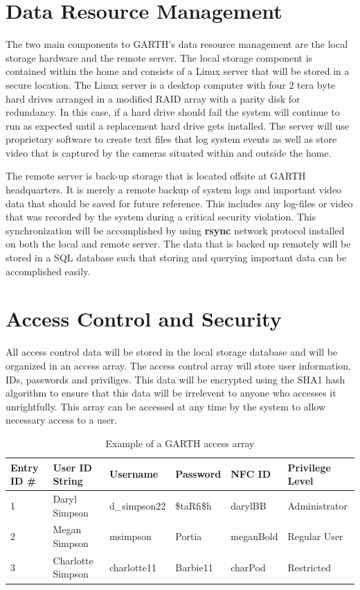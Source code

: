 \documentclass{report}
\begin{document}
\section{Data Resource Management}

The two main components to GARTH's data resource management are the local
storage hardware and the remote server. The local storage component is
contained within the home and consists of a Linux server that will be stored in
a secure location. The Linux server is a desktop computer with four 2 tera byte
hard drives arranged in a modified RAID array with a parity disk for
redundancy. In this case, if a hard drive should fail the system will continue
to run as expected until a replacement hard drive gets installed. The server
will use proprietary software  to create text files that log system events as
well as store video that is captured by the cameras situated within and outside
the home.
 
The remote server is back-up storage that is located offsite at GARTH
headquarters. It is merely a remote backup of system logs and important video
data that should be saved for future reference. This includes any log-files or
video that was recorded by the system during a critical security violation. This
synchronization will be accomplished by using \textbf{rsync} network protocol
installed on both the local and remote server. The data that is backed up
remotely will be stored in a SQL database such that storing and querying
important data can be accomplished easily.

\section{Access Control and Security}

All access control data will be stored in the local storage database and will be
organized in an access array. The access control array will store user
information, IDs, passwords and priviliges.  This data will be encrypted using
the SHA1 hash algorithm to ensure that this data will be irrelevent to anyone
who accesses it unrightfully. This array can be accessed at any time by the
system to allow necessary access to a user. 

\begin{table}[h]
    \caption{Example of a GARTH access array}
    \label{access_array}
    \centering
    \begin{tabular}{| l | l | l | l | l | l |}
    \hline
    \textbf{Entry ID \#}&\textbf{User ID String}&\textbf{Username}&
    \textbf{Password}&\textbf{NFC ID}&\textbf{Privilege Level} \\ \hline
    1&Daryl Simpson&d\_simpson22&\$taRfi\$h&darylBB&Administrator \\ \hline
    2&Megan Simpson&msimpson&Portia&meganBold&Regular User \\ \hline
    3&Charlotte Simpson&charlotte11&Barbie11&charPod&Restricted \\
    \hline
    \end{tabular}
\end{table}
\end{document}
